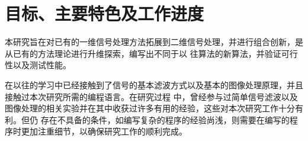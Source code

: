 %
%
%
%

\section{目标、主要特色及工作进度}

本研究旨在对已有的一维信号处理方法拓展到二维信号处理，并进行组合创新，是从已有的方法理论进行升维探索，编写出不同于以
往算法的新算法，并验证可行性以及测试性能。

在以往的学习中已经接触到了信号的基本滤波方式以及基本的图像处理原理，并且接触过本次研究所需的编程语言。在研究过程
中，曾经参与过简单信号滤波以及图像处理的相关实验并在其中收获过许多有用的经验，这些对本次研究工作十分有利。但仍
存在不具备的条件，如编写复杂的程序的经验尚浅，则需要在编写的程序时更加注重细节，以确保研究工作的顺利完成。
